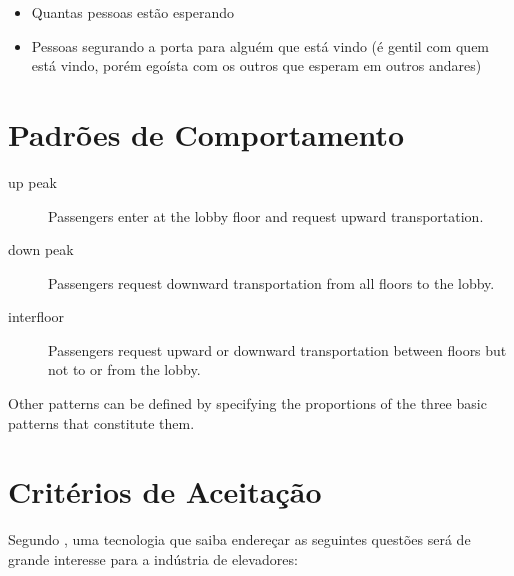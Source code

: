 \begin{itemize}
\item Quantas pessoas estão esperando
\item Pessoas segurando a porta para alguém que está vindo (é gentil com quem está vindo, porém egoísta com os outros que esperam em outros andares)
\end{itemize}

\section{Padrões de Comportamento}

\begin{description}
\item[up peak] Passengers enter at the lobby floor and request upward transportation.
\item[down peak] Passengers request downward transportation from all floors to the lobby.
\item[interfloor] Passengers request upward or downward transportation between floors but not to or from the lobby.
\end{description}

Other patterns can be defined by specifying the proportions of the three basic patterns that constitute them.

\section{Critérios de Aceitação}

Segundo \cite{KOEHLEROTTIGER02}, uma tecnologia que saiba endereçar as seguintes questões será de grande interesse para a indústria de elevadores:

